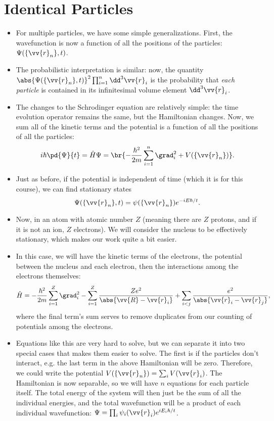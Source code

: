 \section{Identical Particles}

\begin{itemize}
    \item For multiple particles, we have some simple generalizations. First, the wavefunction is now a function of all the positions of the particles: $\Psi(\{\vv{r}_n\}, t)$.
    \item The probabilistic interpretation is similar: now, the quantity $\abs{\Psi(\{\vv{r}_n\}, t)}^2 \prod_{i=1}^n \dd^3\vv{r}_i$ is the probability that \textit{each particle} is contained in its infinitesimal volume element $\dd^3\vv{r}_i$.
    \item The changes to the Schrodinger equation are relatively simple: the time evolution operator remains the same, but the Hamiltonian changes. Now, we sum all of the kinetic terms and the potential is a function of all the positions of all the particles:
        \begin{equation}
            i\hbar\pd{\Psi}{t} = \hat{H}\Psi = \br{-\frac{\hbar^2}{2m}\sum_{i=1}^n\grad_i^2 + V(\{\vv{r}_n\})}.
        \end{equation}
    \item Just as before, if the potential is independent of time (which it is for this course), we can find stationary states
        \begin{equation}
            \Psi(\{\vv{r}_n\}, t) = \psi(\{\vv{r}_n\})e^{-iE\hbar/t}.
        \end{equation}
    \item Now, in an atom with atomic number $Z$ (meaning there are $Z$ protons, and if it is not an ion, $Z$ electrons). We will consider the nucleus to be effectively stationary, which makes our work quite a bit easier.
    \item In this case, we will have the kinetic terms of the electrons, the potential between the nucleus and each electron, then the interactions among the electrons themselves:
        \begin{equation}
            \hat{H} = -\frac{\hbar^2}{2m}\sum_{i=1}^{Z} \grad_{i}^2 - \sum_{i=1}^{Z} \frac{Ze^2}{\abs{\vv{R} - \vv{r}_i}} + \sum_{i<j} \frac{e^2}{\abs{\vv{r}_i - \vv{r}_j}},
        \end{equation}
        where the final term's sum serves to remove duplicates from our counting of potentials among the electrons.
    \item Equations like this are very hard to solve, but we can separate it into two special cases that makes them easier to solve. The first is if the particles don't interact, e.g. the last term in the above Hamiltonian will be zero. Therefore, we could write the potential $V(\{\vv{r}_n\}) = \sum_i V(\vv{r}_i)$. The Hamiltonian is now separable, so we will have $n$ equations for each particle itself. The total energy of the system will then just be the sum of all the individual energies, and the total wavefunction will be a product of each individual wavefunction: $\Psi = \prod_i \psi_i(\vv{r}_i)e^{iE_i\hbar/t}$.

\end{itemize}

